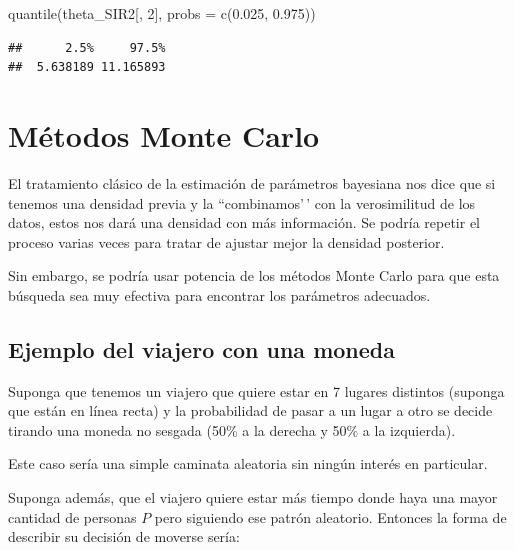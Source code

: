 \documentclass[
  12pt,
]{book}
\newenvironment{Shaded}{\begin{snugshade}}{\end{snugshade}}
\newcommand{\AttributeTok}[1]{\textcolor[rgb]{0.77,0.63,0.00}{#1}}
\newcommand{\DecValTok}[1]{\textcolor[rgb]{0.00,0.00,0.81}{#1}}
\newcommand{\FloatTok}[1]{\textcolor[rgb]{0.00,0.00,0.81}{#1}}
\newcommand{\FunctionTok}[1]{\textcolor[rgb]{0.00,0.00,0.00}{#1}}
\newcommand{\NormalTok}[1]{#1}
\theoremstyle{definition}
\theoremstyle{definition}
\theoremstyle{definition}
\theoremstyle{definition}
\theoremstyle{remark}
\begin{document}
\begin{Shaded}
\begin{Highlighting}[]
\FunctionTok{quantile}\NormalTok{(theta\_SIR2[, }\DecValTok{2}\NormalTok{], }\AttributeTok{probs =} \FunctionTok{c}\NormalTok{(}\FloatTok{0.025}\NormalTok{, }\FloatTok{0.975}\NormalTok{))}
\end{Highlighting}
\end{Shaded}

\begin{verbatim}
##      2.5%     97.5% 
##  5.638189 11.165893
\end{verbatim}

\hypertarget{muxe9todos-monte-carlo}{%
\section{Métodos Monte Carlo}\label{muxe9todos-monte-carlo}}

El tratamiento clásico de la estimación de parámetros bayesiana nos dice que si tenemos una densidad previa y la ``combinamos'\,' con la verosimilitud de los datos, estos nos dará una densidad con más información. Se podría repetir el proceso varias veces para tratar de ajustar mejor la densidad posterior.

Sin embargo, se podría usar potencia de los métodos Monte Carlo para que esta búsqueda sea muy efectiva para encontrar los parámetros adecuados.

\hypertarget{ejemplo-del-viajero-con-una-moneda}{%
\subsection{Ejemplo del viajero con una moneda}\label{ejemplo-del-viajero-con-una-moneda}}

Suponga que tenemos un viajero que quiere estar en 7 lugares distintos (suponga que están en línea recta) y la probabilidad de pasar a un lugar a otro se decide tirando una moneda no sesgada (50\% a la derecha y 50\% a la izquierda).

Este caso sería una simple caminata aleatoria sin ningún interés en particular.

Suponga además, que el viajero quiere estar más tiempo donde haya una mayor cantidad de personas \(P\) pero siguiendo ese patrón aleatorio. Entonces la forma de describir su decisión de moverse sería:
\end{document}
